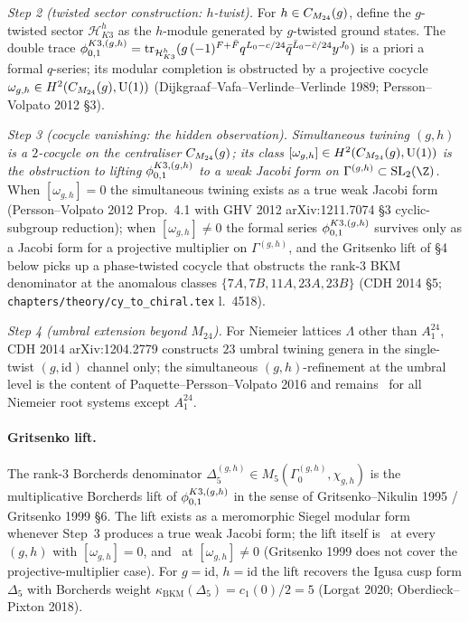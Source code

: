 \emph{Step 2 (twisted sector construction: $h$-twist).}
For $h\in C_{M_{24}}(g)$, define the $g$-twisted sector $\mathcal{H}^{h}_{K3}$
as the $h$-module generated by $g$-twisted ground states.
The double trace
$\phi^{K3,(g,h)}_{0,1} = \mathrm{tr}_{\mathcal{H}^{h}_{K3}}(g\,(-1)^{F+\bar F}
q^{L_0-c/24}\bar q^{\bar L_0-\bar c/24}y^{J_0})$
is a priori a formal $q$-series; its modular completion is
obstructed by a projective cocycle
$\omega_{g,h}\in H^2(C_{M_{24}}(g),\mathrm{U}(1))$
(Dijkgraaf--Vafa--Verlinde--Verlinde 1989; Persson--Volpato 2012 \S 3).

\emph{Step 3 (cocycle vanishing: the hidden observation).}
\emph{Simultaneous twining $(g,h)$ is a $2$-cocycle on the centraliser
$C_{M_{24}}(g)$; its class
$[\omega_{g,h}]\in H^2(C_{M_{24}}(g),\mathrm{U}(1))$
is the obstruction to lifting $\phi^{K3,(g,h)}_{0,1}$ to a weak Jacobi form on
$\Gamma^{(g,h)}\subset\mathrm{SL}_2(\Z)$.}  When $[\omega_{g,h}]=0$ the
simultaneous twining exists as a true weak Jacobi form
(Persson--Volpato 2012 Prop.~4.1 with GHV 2012 arXiv:1211.7074 \S 3
cyclic-subgroup reduction); when $[\omega_{g,h}]\neq 0$ the formal
series $\phi^{K3,(g,h)}_{0,1}$ survives only as a Jacobi form for a projective
multiplier on $\Gamma^{(g,h)}$, and the Gritsenko lift of \S 4 below
picks up a phase-twisted cocycle that obstructs the rank-$3$ BKM
denominator at the anomalous classes $\{7A, 7B, 11A, 23A, 23B\}$
(CDH 2014 \S 5; \texttt{chapters/theory/cy\_to\_chiral.tex}
l.~4518).

\emph{Step 4 (umbral extension beyond $M_{24}$).}
For Niemeier lattices $\Lambda$ other than $A_1^{24}$, CDH 2014
arXiv:1204.2779 constructs $23$ umbral twining genera in the
single-twist $(g,\mathrm{id})$ channel only; the simultaneous
$(g,h)$-refinement at the umbral level is the content of
Paquette--Persson--Volpato 2016 and remains
\ClaimStatusConjectured\ for all Niemeier root systems except
$A_1^{24}$.

\paragraph{Gritsenko lift.}
The rank-$3$ Borcherds denominator
$\Delta_5^{(g,h)}\in M_5(\Gamma^{(g,h)}_0,\chi_{g,h})$ is the
multiplicative Borcherds lift of $\phi^{K3,(g,h)}_{0,1}$ in the sense of
Gritsenko--Nikulin 1995 / Gritsenko 1999 \S 6.  The lift exists as
a meromorphic Siegel modular form whenever Step~3 produces a true
weak Jacobi form; the lift itself is \ClaimStatusTheorem\ at every
$(g,h)$ with $[\omega_{g,h}]=0$, and \ClaimStatusConjectured\ at
$[\omega_{g,h}]\neq 0$ (Gritsenko 1999 does not cover the
projective-multiplier case).  For $g=\mathrm{id}$, $h=\mathrm{id}$
the lift recovers the Igusa cusp form $\Delta_5$ with Borcherds
weight $\kappa_{\mathrm{BKM}}(\Delta_5) = c_1(0)/2 = 5$
(Lorgat 2020; Oberdieck--Pixton 2018).

